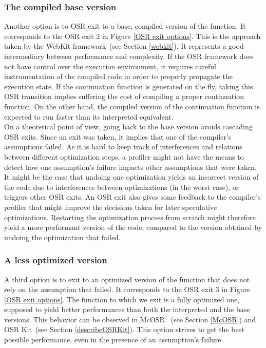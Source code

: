 \subsubsection{The compiled base version}
Another option is to OSR exit to a base, compiled version of the function.
It corresponds to the OSR exit 2 in Figure \ref{OSR exit options}.
This is the approach taken by the WebKit framework~\cite{WebKitURL}(see Section \ref{webkit}).
It represents a good intermediary between performance and complexity.
If the OSR framework does not have control over the execution environment, it requires careful instrumentation of the compiled code in order to properly propagate the execution state.
If the continuation function is generated on the fly, taking this OSR transition implies suffering the cost of compiling a proper continuation function.
On the other hand, the compiled version of the continuation function is expected to run faster than its interpreted equivalent.\\

On a theoretical point of view, going back to the base version avoids cascading OSR exits.
Since an exit was taken, it implies that one of the compiler's assumptions failed.
As it is hard to keep track of interferences and relations between different optimization steps, a profiler might not have the means to detect how one assumption's failure impacts other assumptions that were taken.
It might be the case that undoing one optimization yields an incorrect version of the code due to interferences between optimizations (in the worst case), or triggers other OSR exits.
An OSR exit also gives some feedback to the compiler's profiler that might improve the decisions taken for later speculative optimizations.
Restarting the optimization process from scratch might therefore yield a more performant version of the code, compared to the version obtained by undoing the optimization that failed.\\

\subsubsection{A less optimized version}
A third option is to exit to an optimized version of the function that does not rely on the assumption that failed.
It corresponds to the OSR exit 3 in Figure \ref{OSR exit options}.
The function to which we exit is a fully optimized one, supposed to yield better performances than both the interpreted and the base versions.
This behavior can be observed in McOSR~\cite{lameed2013modular} (see Section \ref{McOSR}) and OSR Kit~\cite{OSRKit}(see Section \ref{describeOSRKit}).
This option strives to get the best possible performance, even in the presence of an assumption's failure.\\

